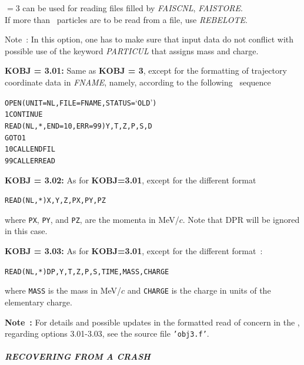 \bigskip

\noindent\KOBJ $= 3 $    can be used for reading files filled by \textsl{FAISCNL}, \textsl{FAISTORE}.\\
If more than \IMAX\ particles are to be read from a file, use  \textsl{REBELOTE}.   

\bigskip

\noindent Note~: In this option, one has to make sure that input data do not conflict with possible use of 
the keyword \textsl{PARTICUL} that  assigns   mass and charge.

\bigskip

\noindent\textbf{KOBJ = 3.01:} Same as \textbf{KOBJ = 3}, except for the formatting of trajectory coordinate 
data in  \textsl{FNAME}, namely, according to the following \FORTRAN\ sequence 
\begin{alltt}
\footnotesize
         OPEN (UNIT = NL, FILE = FNAME, STATUS = `OLD')
    1    CONTINUE
         READ (NL,*,END=10,ERR=99) Y, T, Z, P, S, D
         GOTO 1
   10    CALL ENDFIL
   99    CALL ERREAD
\end{alltt} 

\bigskip

\noindent\textbf{KOBJ = 3.02:} As for \textbf{KOBJ=3.01}, except for the different format
\begin{alltt}
         READ(NL,*) X,Y,Z,PX,PY,PZ
\end{alltt}
where \texttt{PX}, \texttt{PY}, and \texttt{PZ}, are the momenta in
MeV/$c$.  Note that DPR will be ignored in this case.

\bigskip

\noindent\textbf{KOBJ = 3.03:} As for \textbf{KOBJ=3.01}, except for the different format~: 
\begin{alltt}
         READ(NL,*) DP,Y,T,Z,P,S,TIME,MASS,CHARGE
\end{alltt}
where \texttt{MASS} is the mass in MeV/$c$ and \texttt{CHARGE} is the
charge in units of the elementary charge.  



\bigskip

\noindent \textbf{Note~:}  For details and possible updates in the formatted read of concern in the \FORTRAN, 
regarding options 3.01-3.03, see the source file \texttt{'obj3.f'}.


\paragraph{\textit{RECOVERING FROM A CRASH}}

